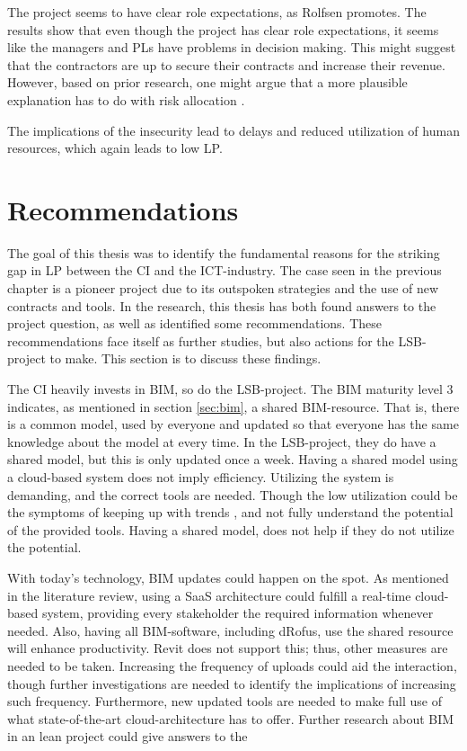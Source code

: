The project seems to have clear role expectations, as Rolfsen promotes\cite{rolfsen}. The results show that even though the project has clear role expectations, it seems like the managers and PLs have problems in decision making. This might suggest that the contractors are up to secure their contracts and increase their revenue. However, based on prior research, one might argue that a more plausible explanation has to do with risk allocation \cite{zaghloul2003construction}. 

The implications of the insecurity lead to delays and reduced utilization of human resources, which again leads to low LP.

\section{Recommendations}
The goal of this thesis was to identify the fundamental reasons for the striking gap in LP between the CI and the ICT-industry. The case seen in the previous chapter is a pioneer project due to its outspoken strategies and the use of new contracts and tools. In the research, this thesis has both found answers to the project question, as well as identified some recommendations. These recommendations face itself as further studies, but also actions for the LSB-project to make. This section is to discuss these findings.

The CI heavily invests in BIM, so do the LSB-project. The BIM maturity level 3 indicates, as mentioned in section \ref{sec:bim}, a shared BIM-resource. That is, there is a common model, used by everyone and updated so that everyone has the same knowledge about the model at every time. In the LSB-project, they do have a shared model, but this is only updated once a week. Having a shared model using a cloud-based system does not imply efficiency. Utilizing the system is demanding, and the correct tools are needed. Though the low utilization could be the symptoms of keeping up with trends \cite{rolfsen2004tyranny}, and not fully understand the potential of the provided tools. Having a shared model, does not help if they do not utilize the potential.

With today's technology, BIM updates could happen on the spot. As mentioned in the literature review, using a SaaS architecture could fulfill a real-time cloud-based system, providing every stakeholder the required information whenever needed. Also, having all BIM-software, including dRofus, use the shared resource will enhance productivity. Revit does not support this; thus, other measures are needed to be taken. Increasing the frequency of uploads could aid the interaction, though further investigations are needed to identify the implications of increasing such frequency. Furthermore, new updated tools are needed to make full use of what state-of-the-art cloud-architecture has to offer. Further research about BIM in an lean project could give answers to the 


